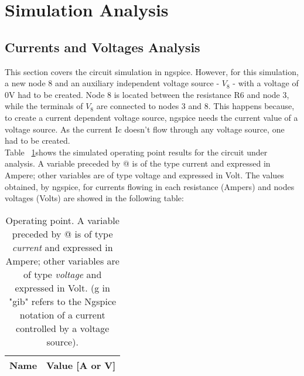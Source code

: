 \newpage
\section{Simulation Analysis}
\label{sec:simulation}

\subsection{Currents and Voltages Analysis}
This section covers the circuit simulation in ngspice. However, for this simulation, 
a new node 8 and an auxiliary independent voltage source - $V_8$ - with a voltage of 0V had to be created. 
Node 8 is located between the resistance R6 and node 3, while the terminals of $V_8$ are connected to nodes 3 and 8. 
This happens because, to create a current dependent voltage source, ngspice needs the current value of a voltage source. 
As the current Ic doesn't flow through any voltage source, one had to be created. \\
\noindent Table ~\ref{tab:op}shows the simulated operating point results for the circuit under analysis.
A variable preceded by @ is of the type current and expressed in Ampere; 
other variables are of type voltage and expressed in Volt.
The values obtained, by ngspice, for currents flowing in each resistance (Ampers) and nodes voltages (Volts) are showed in the following table:
\begin{table}[h!]
  \centering
  \begin{tabular}{|c|c|}
    \hline    
    {\bf Name} & {\bf Value [A or V]} \\ \hline
    
  \end{tabular}
  \caption{Operating point. A variable preceded by @ is of type {\em current}
    and expressed in Ampere; other variables are of type {\it voltage} and expressed in
    Volt. (g in "gib" refers to the Ngspice notation of a current controlled by a voltage source).}
  \label{tab:op}
\end{table}





